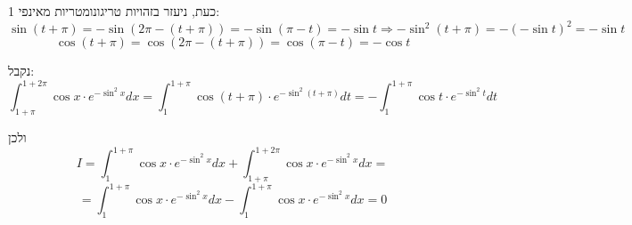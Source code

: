 \documentclass{article}
\begin{document}
כעת, ניעזר בזהויות טריגונומטריות מאינפי 1:
\[
    \sin(t+\pi) = -\sin(2\pi - (t+\pi)) = -\sin (\pi - t) = -\sin t
    \Rightarrow -\sin^2(t+\pi) = -(-\sin t)^2 =-\sin t
\]
\[
    \cos(t+\pi) = \cos (2\pi - (t+\pi)) = \cos (\pi - t) = -\cos t
\]

נקבל:
\[
    \int_{1+\pi}^{1+2\pi}\cos x \cdot e^{-\sin^2x}dx =
    \int_1^{1+\pi} \cos (t+\pi) \cdot e^{-\sin^2(t+\pi)}dt =
    -\int_1^{1+\pi} \cos t \cdot e^{-\sin^2t}dt
\]

ולכן
\[
    I =
    \int_1^{1+\pi}\cos x \cdot e^{-\sin^2x}dx +
    \int_{1+\pi}^{1+2\pi}\cos x \cdot e^{-\sin^2x}dx =
\]
\[
    =\int_1^{1+\pi}\cos x \cdot e^{-\sin^2x}dx -
    \int_1^{1+\pi}\cos x \cdot e^{-\sin^2x}dx =
    0
\]
\end{document}
